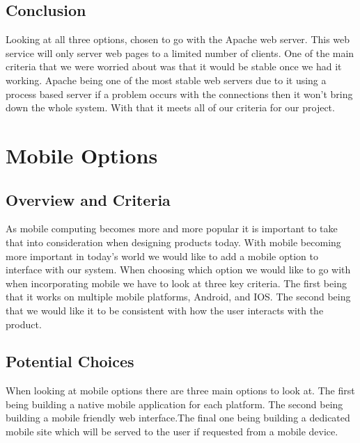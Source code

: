 \documentclass[onecolumn, draftclsnofoot,10pt, compsoc]{IEEEtran}
\begin{document}
		\subsection{Conclusion}
		Looking at all three options, chosen to go with the Apache web server.
		This web service will only server web pages to a limited number of clients.
		One of the main criteria that we were worried about was that
		it would be stable once we had it working. Apache being one of the most stable
		web servers due to it using a process based server if a problem occurs with
		the connections then it won’t bring down the whole system. With that it meets
		all of our criteria for our project.
	\newpage
	\section{Mobile Options}
		\subsection{Overview and Criteria}
 		As mobile computing becomes more and more popular it is important to take
		that into consideration when designing products today. With mobile becoming
		more important in today's world we would like to add a mobile option to interface
		with our system. When choosing which option we would like to go with when
		incorporating mobile we have to look at three key criteria. The first being
		that it works on multiple mobile platforms, Android, and IOS. The second being
		that we would like it to be consistent with how the user interacts with the
		product.
		\subsection{Potential Choices}
		When looking at mobile options there are three main options to look at. The
		first being building a native mobile application for each platform. The second
		being building a mobile friendly web interface.The final one being building
		a dedicated mobile site which will be served to the user if requested from
		a mobile device.
\end{document}
